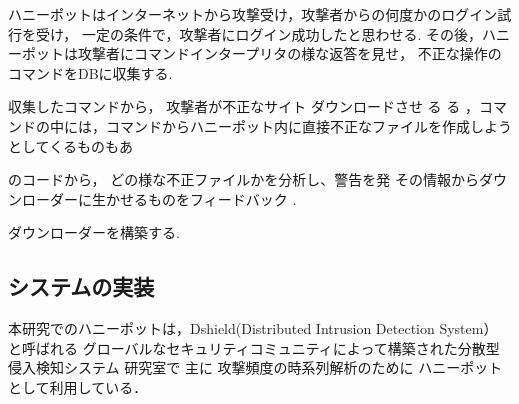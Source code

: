 \documentclass{entry}
\begin{document}
ハニーポットはインターネットから攻撃受け，攻撃者からの何度かのログイン試行を受け，
一定の条件で，攻撃者にログイン成功したと思わせる.
その後，ハニーポットは攻撃者にコマンドインタープリタの様な返答を見せ，
不正な操作のコマンドをDBに収集する.

収集したコマンドから，
攻撃者が不正なサイト
ダウンロードさせ
る
る
，コマンドの中には，コマンドからハニーポット内に直接不正なファイルを作成しようとしてくるものもあ

のコードから，
どの様な不正ファイルかを分析し、警告を発
その情報からダウンローダーに生かせるものをフィードバック
.

ダウンローダーを構築する.



\subsection{システムの実装}

本研究でのハニーポットは，Dshield(Distributed Intrusion Detection System）
と呼ばれる
グローバルなセキュリティコミュニティによって構築された分散型侵入検知システム
研究室で
主に
{攻撃頻度の時系列解析のために}
ハニーポットとして利用している\cite{nishida2022}．
\end{document}
